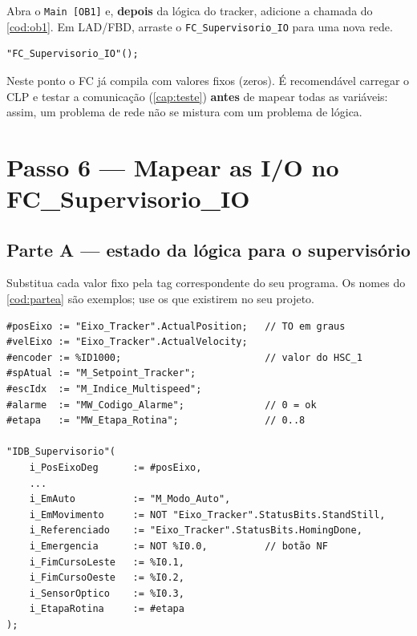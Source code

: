 \documentclass[12pt, oneside, a4paper, chapter=TITLE, section=TITLE, english, brazil]{abntex2}
\begin{document}
Abra o \texttt{Main [OB1]} e, \textbf{depois} da lógica do tracker, adicione a chamada do \autoref{cod:ob1}. Em LAD/FBD, arraste o \texttt{FC\_Supervisorio\_IO} para uma nova rede.

\begin{lstlisting}[caption={Chamada no OB1 (SCL)}, label={cod:ob1}]
"FC_Supervisorio_IO"();
\end{lstlisting}

Neste ponto o FC já compila com valores fixos (zeros). É recomendável carregar o CLP e testar a comunicação (\autoref{cap:teste}) \textbf{antes} de mapear todas as variáveis: assim, um problema de rede não se mistura com um problema de lógica.

\chapter{Passo 6 --- Mapear as I/O no FC\_Supervisorio\_IO}

\section{Parte A --- estado da lógica para o supervisório}

Substitua cada valor fixo pela tag correspondente do seu programa. Os nomes do \autoref{cod:partea} são exemplos; use os que existirem no seu projeto.

\begin{lstlisting}[caption={Parte A do FC\_Supervisorio\_IO (exemplo preenchido)}, label={cod:partea}]
#posEixo := "Eixo_Tracker".ActualPosition;   // TO em graus
#velEixo := "Eixo_Tracker".ActualVelocity;
#encoder := %ID1000;                         // valor do HSC_1
#spAtual := "M_Setpoint_Tracker";
#escIdx  := "M_Indice_Multispeed";
#alarme  := "MW_Codigo_Alarme";              // 0 = ok
#etapa   := "MW_Etapa_Rotina";               // 0..8

"IDB_Supervisorio"(
    i_PosEixoDeg      := #posEixo,
    ...
    i_EmAuto          := "M_Modo_Auto",
    i_EmMovimento     := NOT "Eixo_Tracker".StatusBits.StandStill,
    i_Referenciado    := "Eixo_Tracker".StatusBits.HomingDone,
    i_Emergencia      := NOT %I0.0,          // botão NF
    i_FimCursoLeste   := %I0.1,
    i_FimCursoOeste   := %I0.2,
    i_SensorOptico    := %I0.3,
    i_EtapaRotina     := #etapa
);
\end{lstlisting}
\end{document}
